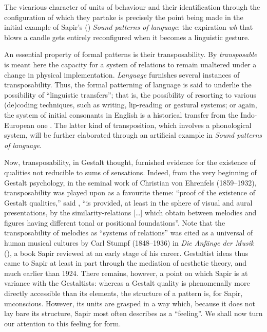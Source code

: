 \documentclass[output=paper]{langscibook}
\begin{document}
The vicarious character of units of behaviour and their identification through the configuration of which they partake is precisely the point being made in the initial example of Sapir's (\citeyear{Sapir1925}) \emph{Sound patterns of language}: the expiration \emph{wh} that blows a candle gets entirely reconfigured when it becomes a linguistic gesture. 

An essential property of formal patterns is their transposability. By \emph{transposable} is meant here the capacity for a system of relations to remain unaltered under a change in physical implementation. \emph{Language} furnishes several instances of transposability. Thus, the formal patterning of language is said to underlie the possibility of ``linguistic transfers''; that is, the possibility of resorting to various (de)coding techniques, such as writing, lip-reading or gestural systems; or again, the system of initial consonants in English is a historical transfer from the Indo-European one \citep[200]{Sapir1921}. The latter kind of transposition, which involves a phonological system, will be further elaborated through an artificial example in \emph{Sound patterns of language}.

Now, transposability, in Gestalt thought, furnished evidence for the existence of qualities not reducible to sums of sensations. Indeed, from the very beginning of Gestalt psychology, in the seminal work of Christian von Ehrenfels (1859--1932), transposability was played upon as a favourite theme: ``proof of the existence of Gestalt qualities,'' said \citet[90]{Ehrenfels1988}, ``is provided, at least in the sphere of visual and aural presentations, by the similarity-relations […] which obtain between melodies and figures having different tonal or positional foundations''. Note that the transposability of melodies as ``systems of relations'' was cited as a universal of human musical cultures by Carl Stumpf (1848--1936) in \emph{Die Anfänge der Musik} (\citeyear{Stumpf1911}), a book Sapir reviewed at an early stage of his career. Gestaltist ideas thus came to Sapir at least in part through the mediation of aesthetic theory, and much earlier than 1924. There remains, however, a point on which Sapir is at variance with the Gestaltists: whereas a Gestalt quality is phenomenally more directly accessible than its elements, the structure of a pattern is, for Sapir, unconscious. However, its units are grasped in a way which, because it does not lay bare its structure, Sapir most often describes as a ``feeling''. We shall now turn our attention to this feeling for form.
\end{document}
